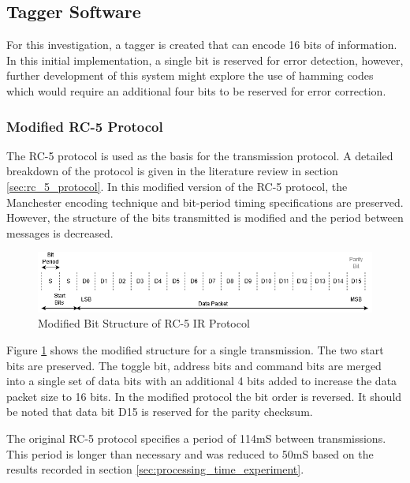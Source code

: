 


\subsection{Tagger Software}

For this investigation, a tagger is created that can encode 16 bits of information. In this initial implementation, a single bit is reserved for error detection, however, further development of this system might explore the use of hamming codes which would require an additional four bits to be reserved for error correction.

\subsubsection{Modified RC-5 Protocol}
\label{sec:modified_rc5_protocol}
The RC-5 protocol is used as the basis for the transmission protocol. A detailed breakdown of the protocol is given in the literature review in section \ref{sec:rc_5_protocol}. In this modified version of the RC-5 protocol, the Manchester encoding technique and bit-period timing specifications are preserved. However, the structure of the bits transmitted is modified and the period between messages is decreased.

\begin{figure}[H]
	\centering
	\includegraphics[width=0.8\linewidth]{figures/design/modified_rc5_protocol.png}
	\caption{Modified Bit Structure of RC-5 IR Protocol}
	\label{fig:modified_rc_5_protocol}
\end{figure}

Figure \ref{fig:modified_rc_5_protocol} shows the modified structure for a single transmission. The two start bits are preserved. The toggle bit, address bits and command bits are merged into a single set of data bits with an additional 4 bits added to increase the data packet size to 16 bits. In the modified protocol the bit order is reversed. It should be noted that data bit D15 is reserved for the parity checksum.

The original RC-5 protocol specifies a period of 114mS between transmissions. This period is longer than necessary and was reduced to 50mS based on the results recorded in section \ref{sec:processing_time_experiment}.

